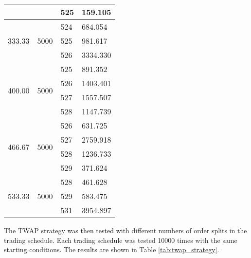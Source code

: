 \begin{table}[htbp]
\begin{center}
\begin{tabular}{l|l|l|l}
                        &                          & 525   & 159.105  \\
\hline                        
\multirow{3}{*}{333.33} & \multirow{3}{*}{5000} & 524   & 684.054  \\
                        &                          & 525   & 981.617  \\
                        &                          & 526   & 3334.330 \\
\hline                        
\multirow{4}{*}{400.00} & \multirow{4}{*}{5000} & 525   & 891.352  \\
                        &                          & 526   & 1403.401 \\
                        &                          & 527   & 1557.507 \\
                        &                          & 528   & 1147.739 \\
\hline                        
\multirow{4}{*}{466.67} & \multirow{4}{*}{5000} & 526   & 631.725  \\
                        &                          & 527   & 2759.918 \\
                        &                          & 528   & 1236.733 \\
                        &                          & 529   & 371.624  \\
\hline                        
\multirow{3}{*}{533.33} & \multirow{3}{*}{5000} & 528   & 461.628  \\
                        &                          & 529   & 583.475  \\
                        &                          & 531   & 3954.897
\end{tabular}
\end{center}
\end{table}

The TWAP strategy was then tested with different numbers of order splits in the trading schedule. Each trading schedule was tested 10000 times with the same starting conditions. The results are shown in Table \ref{tab:twap_strategy}.


